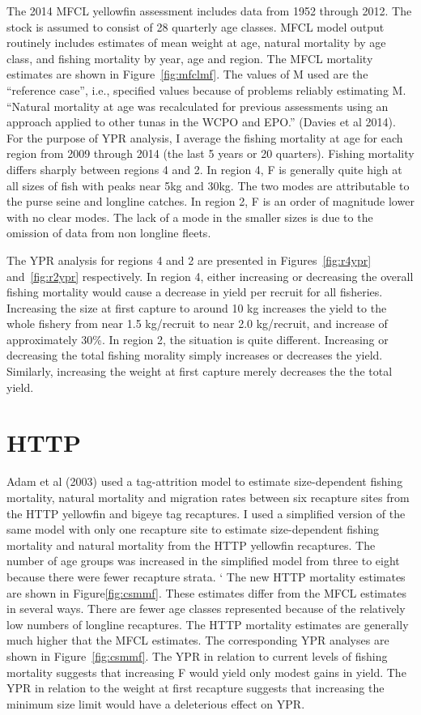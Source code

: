 \documentclass[12pt,letterpaper]{article}
\begin{document}
The 2014 MFCL yellowfin assessment includes data from 1952 through
2012. The stock is assumed to consist of 28 quarterly age classes. 
MFCL model output routinely includes estimates of mean weight at age,
natural mortality by age class, and fishing mortality by year, age
and region. 
The MFCL mortality estimates are shown in Figure~\ref{fig:mfclmf}. 
The values of M used are the ``reference case'', i.e., 
specified values because of problems reliably estimating M. 
``Natural mortality at age was recalculated for previous assessments
using an approach applied to other tunas in the WCPO and EPO.'' (Davies
et al 2014).
For the purpose of YPR analysis, I average the fishing
mortality at age for each region from 2009 through 2014 (the last 5
years or 20 quarters). 
Fishing mortality differs sharply between regions 4 and 2. In region
4, F is generally quite high at all sizes of fish with peaks near 5kg
and 30kg. The two modes are attributable to the purse seine and
longline catches.
In region 2, F is an order of magnitude lower with no clear
modes. The lack of a mode in the smaller sizes is due to the omission
of data from non longline fleets.


The YPR analysis for regions 4 and 2 are
presented in Figures~\ref{fig:r4ypr} and~\ref{fig:r2ypr} respectively.
In region 4, either increasing or decreasing the overall fishing
mortality would cause a decrease in yield per recruit for all
fisheries.
Increasing the size at first capture to around 10 kg increases the
yield to the whole fishery from near 1.5 kg/recruit to near 2.0
kg/recruit, and increase of approximately 30\%.
In region 2, the situation is quite different. 
Increasing or decreasing the total fishing morality simply increases
or decreases the yield.
Similarly, increasing the weight at first capture merely decreases the
the total yield.

\section*{HTTP}
Adam et al (2003) used a tag-attrition model to estimate
size-dependent fishing mortality, natural
mortality and migration rates between six recapture sites from the
HTTP yellowfin and bigeye tag recaptures. 
I used a simplified version of the same
model with only one recapture site to estimate size-dependent fishing
mortality and natural mortality from the HTTP yellowfin recaptures.
The number of age groups was increased in the simplified model
from three to
eight because there were fewer recapture strata.
`
The new HTTP mortality estimates are shown in Figure\ref{fig:csmmf}.
These estimates differ from the MFCL estimates in several ways. There
are fewer age classes represented because of the relatively low numbers
of longline recaptures. The HTTP mortality estimates are generally
much higher that the MFCL estimates.
The corresponding YPR analyses are shown in Figure~\ref{fig:csmmf}.
The YPR in relation to current levels of fishing mortality suggests
that increasing F would yield only modest gains in yield.
The YPR in relation to the weight at first recapture suggests that
increasing the minimum size limit would have a deleterious effect on
YPR.
\end{document}

